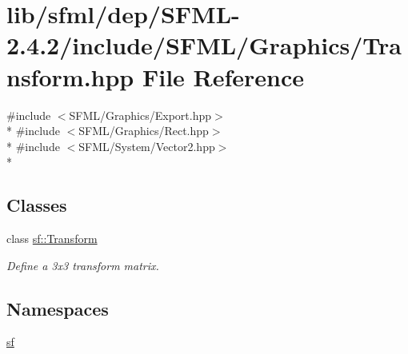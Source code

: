 \hypertarget{sfml_2dep_2_s_f_m_l-2_84_82_2include_2_s_f_m_l_2_graphics_2_transform_8hpp}{\section{lib/sfml/dep/\-S\-F\-M\-L-\/2.4.2/include/\-S\-F\-M\-L/\-Graphics/\-Transform.hpp File Reference}
\label{sfml_2dep_2_s_f_m_l-2_84_82_2include_2_s_f_m_l_2_graphics_2_transform_8hpp}
}
{\ttfamily \#include $<$S\-F\-M\-L/\-Graphics/\-Export.\-hpp$>$}\\*
{\ttfamily \#include $<$S\-F\-M\-L/\-Graphics/\-Rect.\-hpp$>$}\\*
{\ttfamily \#include $<$S\-F\-M\-L/\-System/\-Vector2.\-hpp$>$}\\*
\subsection*{Classes}
\begin{DoxyCompactItemize}
\item 
class \hyperlink{classsf_1_1_transform}{sf\-::\-Transform}
\begin{DoxyCompactList}\small\item\em Define a 3x3 transform matrix. \end{DoxyCompactList}\end{DoxyCompactItemize}
\subsection*{Namespaces}
\begin{DoxyCompactItemize}
\item 
\hyperlink{namespacesf}{sf}
\end{DoxyCompactItemize}
